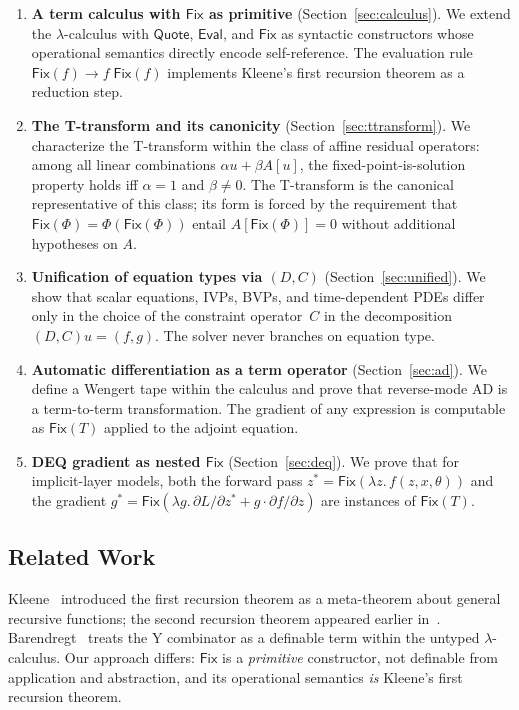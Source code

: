 \documentclass{lmcs}
\theoremstyle{plain}
\theoremstyle{definition}
\newcommand{\Lam}[1]{\lambda #1.\,}
\newcommand{\app}[2]{#1\;#2}
\newcommand{\fix}{\mathsf{Fix}}
\newcommand{\quoteop}{\mathsf{Quote}}
\newcommand{\evalop}{\mathsf{Eval}}
\begin{document}
\begin{enumerate}
\item \textbf{A term calculus with $\fix$ as primitive}
  (Section~\ref{sec:calculus}). We extend the $\lambda$-calculus with
  $\quoteop$, $\evalop$, and $\fix$ as syntactic constructors whose
  operational semantics directly encode self-reference. The evaluation rule
  $\fix(f) \to \app{f}{\fix(f)}$ implements Kleene's first recursion theorem
  as a reduction step.

\item \textbf{The T-transform and its canonicity}
  (Section~\ref{sec:ttransform}). We characterize the T-transform within the
  class of affine residual operators: among all linear combinations
  $\alpha u + \beta A[u]$, the fixed-point-is-solution property holds iff
  $\alpha = 1$ and $\beta \neq 0$. The T-transform is the canonical
  representative of this class; its form is forced by the requirement that
  $\fix(\Phi) = \Phi(\fix(\Phi))$ entail $A[\fix(\Phi)] = 0$ without
  additional hypotheses on $A$.

\item \textbf{Unification of equation types via $(D, C)$}
  (Section~\ref{sec:unified}). We show that scalar equations, IVPs, BVPs, and
  time-dependent PDEs differ only in the choice of the constraint
  operator~$C$ in the decomposition $(D, C)u = (f, g)$. The solver never
  branches on equation type.

\item \textbf{Automatic differentiation as a term operator}
  (Section~\ref{sec:ad}). We define a Wengert tape within the calculus and
  prove that reverse-mode AD is a term-to-term transformation. The gradient
  of any expression is computable as $\fix(T)$ applied to the adjoint
  equation.

\item \textbf{DEQ gradient as nested $\fix$}
  (Section~\ref{sec:deq}). We prove that for implicit-layer models, both the
  forward pass $z^* = \fix(\Lam{z} f(z, x, \theta))$ and the gradient
  $g^* = \fix(\Lam{g} \partial L/\partial z^* + g \cdot \partial f/\partial z)$
  are instances of $\fix(T)$.
\end{enumerate}

\subsection{Related Work}

Kleene~\cite{kleene1952} introduced the first recursion theorem as a
meta-theorem about general recursive functions; the second recursion theorem
appeared earlier in~\cite{kleene1938}.
Barendregt~\cite{barendregt1984} treats the Y combinator as a definable term
within the untyped $\lambda$-calculus. Our approach differs: $\fix$ is a
\emph{primitive} constructor, not definable from application and abstraction,
and its operational semantics \emph{is} Kleene's first recursion theorem.
\end{document}
